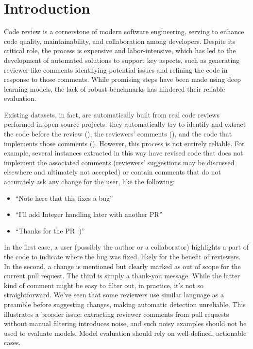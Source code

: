 \section{Introduction}
Code review is a cornerstone of modern software engineering, serving to enhance
code quality, maintainability, and collaboration among developers. Despite its critical
role, the process is expensive and labor-intensive, which has led to the development
of automated solutions to support key aspects, such as generating reviewer-like
comments identifying potential issues and refining the code in response to those comments.
While promising steps have been made using deep learning models, the lack of robust
benchmarks has hindered their reliable evaluation.

Existing datasets, in fact, are automatically built from real code reviews
performed in open-source projects: they automatically try to identify and
extract the code before the review (\subCode), the reviewers' comments
(\revComment), and the code that implements those comments (\revCode). However,
this process is not entirely reliable. For example, several instances extracted
in this way have revised code that does not implement the associated comments
(reviewers' suggestions may be discussed elsewhere and ultimately not accepted)
or contain comments that do not accurately ask any change for the user, like the following:

\begin{itemize}
    \item ``Note here that this fixes a bug''
    \item ``I'll add Integer handling later with another PR''
    \item ``Thanks for the PR :)''
\end{itemize}

In the first case, a user (possibly the author or a collaborator) highlights a part of the code to
indicate where the bug was fixed, likely for the benefit of reviewers. In the second, a change is
mentioned but clearly marked as out of scope for the current pull request. The third is simply a
thank-you message. While the latter kind of comment might be easy to filter out, in practice, it’s
not so straightforward. We've seen that some reviewers use similar language as a preamble before
suggesting changes, making automatic detection unreliable. This illustrates a broader issue:
extracting reviewer comments from pull requests without manual filtering introduces noise, and such
noisy examples should not be used to evaluate models. Model evaluation should rely on well-defined,
actionable cases.

